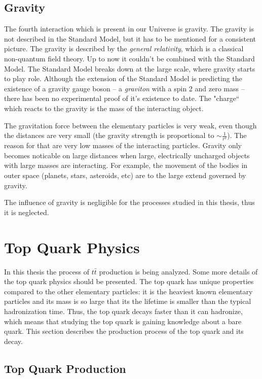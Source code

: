 \subsection{Gravity}

The fourth interaction which is present in our Universe is gravity. The gravity is not described in the Standard Model, but it has to be mentioned for a consistent 
picture. The gravity is described by the \textit{general relativity}, which is a classical non-quantum field theory. Up to now it couldn't be combined with the
Standard Model. The Standard Model breaks down at the large scale, where gravity starts to play role. Although the extension of the Standard Model is predicting 
the existence of a gravity gauge boson -- a \textit{graviton} with a spin 2 and zero mass -- there has been no experimental proof of it's existence to date.
The "charge`` which reacts to the gravity is the mass of the interacting object.

The gravitation force between the elementary particles is very weak, even though the distances are very small (the gravity strength is proportional to $\sim\frac{1}{r^{2}}$). 
The reason for that are very low masses of the interacting particles. Gravity only becomes noticable
on large distances when large, electrically uncharged objects with large masses are interacting. For example, the movement of the bodies in outer space 
(planets, stars, asteroids, etc) are to the large extend governed by gravity. 

The influence of gravity is negligible for the processes studied in this thesis, thus it is neglected.

\section{Top Quark Physics}

In this thesis the process of $t\bar{t}$ production is being analyzed. Some more details of the top quark physics should be presented.
The top quark has unique properties compared to the other elementary particles: it is the heaviest known elementary particles and its mass is so large that its the lifetime 
is smaller than the typical hadronization time. Thus, the top quark decays 
faster than it can hadronize, which means that studying the top quark is gaining knowledge about a bare quark. This section describes the production process of the top quark and its decay.

\subsection{Top Quark Production}\label{ssec:tprod}

